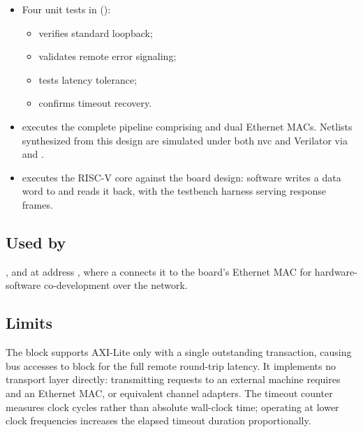 \begin{itemize}
\item Four unit tests in  ():
\begin{itemize}
\item {}
verifies standard loopback;
\item {} validates
remote error signaling;
\item {} tests latency tolerance;
\item {}
confirms timeout recovery.
\end{itemize}
\item {} executes the complete pipeline comprising
 and dual Ethernet MACs. Netlists synthesized from this design
are simulated under both nvc and Verilator via
 and
.
\item {} executes the RISC-V core against the board
design: software writes a data word to  and reads it back, with the
testbench harness serving response frames.
\end{itemize}

\subsection*{Used by}

, and  at address , where a
 connects it to the board's Ethernet MAC for hardware-software
co-development over the network.

\subsection*{Limits}

The block supports AXI-Lite only with a single outstanding transaction, causing
bus accesses to block for the full remote round-trip latency. It implements no
transport layer directly: transmitting  requests to an external machine
requires  and an Ethernet MAC, or equivalent channel adapters.
The timeout counter measures clock cycles rather than absolute wall-clock time;
operating at lower clock frequencies increases the elapsed timeout duration proportionally.
